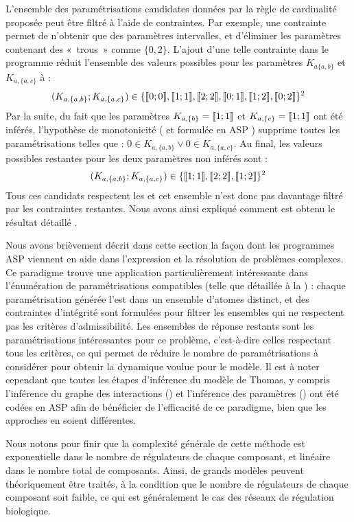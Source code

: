 \begin{example}
  L'ensemble des paramétrisations candidates données par la règle de cardinalité
  proposée  peut être filtré à l'aide de contraintes.
  Par exemple, une contrainte permet de n'obtenir que des paramètres intervalles,
  et d'éliminer les paramètres contenant des «~trous~» comme $\{ 0, 2 \}$.
  L'ajout d'une telle contrainte dans le programme réduit l'ensemble des valeurs possibles
  pour les paramètres $K_{a\{a,b\}}$ et $K_{a,\{a,c\}}$ à :
  \begin{align*}
    (K_{a,\{a,b\}} ; K_{a,\{a,c\}}) \in \{ \mathopen{\llbracket}0\mathclose{};0\mathclose{\rrbracket} , \mathopen{\llbracket}1\mathclose{};1\mathclose{\rrbracket} , \mathopen{\llbracket}2\mathclose{};2\mathclose{\rrbracket} ,
    \mathopen{\llbracket}0\mathclose{};1\mathclose{\rrbracket} , \mathopen{\llbracket}1\mathclose{};2\mathclose{\rrbracket} , \mathopen{\llbracket}0\mathclose{};2\mathclose{\rrbracket} \}^2
  \end{align*}
  Par la suite, du fait que les paramètres $K_{a,\{b\}} = \mathopen{\llbracket}1\mathclose{};1\mathclose{\rrbracket}$ et
  $K_{a,\{c\}} = \mathopen{\llbracket}1\mathclose{};1\mathclose{\rrbracket}$ ont été inférés,
  l'hypothèse de monotonicité ( et formulée en ASP
  )
  supprime toutes les paramétrisations telles que :
  $0 \in K_{a,\{a,b\}} \vee 0 \in K_{a,\{a,c\}}$.
  Au final, les valeurs possibles restantes pour les deux paramètres non inférés sont :
  \begin{align*}
    (K_{a,\{a,b\}} ; K_{a,\{a,c\}}) \in \{ \mathopen{\llbracket}1\mathclose{};1\mathclose{\rrbracket} , \mathopen{\llbracket}2\mathclose{};2\mathclose{\rrbracket} , \mathopen{\llbracket}1\mathclose{};2\mathclose{\rrbracket} \}^2
  \end{align*}
  Tous ces candidats respectent les 
  et cet ensemble n'est donc pas davantage filtré par les contraintes restantes.
  Nous avons ainsi expliqué comment est obtenu le résultat détaillé
  .
\end{example}

\myskip

Nous avons brièvement décrit dans cette section la façon dont les programmes ASP viennent
en aide dans l'expression et la résolution de problèmes complexes.
Ce paradigme trouve une application particulièrement intéressante dans l'énumération
de paramétrisations compatibles (telle que détaillée à la ) :
chaque paramétrisation générée l'est dans un ensemble d'atomes distinct,
et des contraintes d'intégrité sont formulées pour filtrer les ensembles qui ne respectent
pas les critères d'admissibilité.
Les ensembles de réponse restants sont les paramétrisations intéressantes pour ce
problème, c'est-à-dire celles respectant tous les critères,
ce qui permet de réduire le nombre de paramétrisations à considérer pour obtenir
la dynamique voulue pour le modèle.
Il est à noter cependant que toutes les étapes d'inférence du modèle de Thomas,
y compris l'inférence du graphe des interactions ()
et l'inférence des paramètres ()
ont été codées en ASP afin de bénéficier de l'efficacité de ce paradigme,
bien que les approches en soient différentes.

Nous notons pour finir que la complexité générale
de cette méthode est exponentielle dans le nombre
de régulateurs de chaque composant, et linéaire dans le nombre total de composants.
Ainsi, de grands modèles peuvent théoriquement être traités,
à la condition que le nombre de régulateurs de chaque composant soit faible,
ce qui est généralement le cas des réseaux de régulation biologique.
